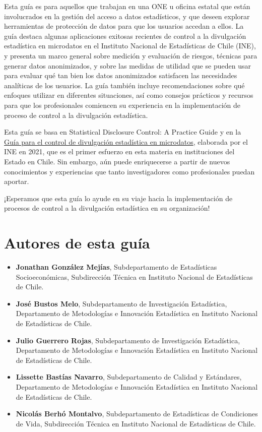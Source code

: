 \documentclass[
]{book}
\theoremstyle{definition}
\theoremstyle{definition}
\theoremstyle{definition}
\theoremstyle{definition}
\theoremstyle{remark}
\begin{document}
Esta guía es para aquellos que trabajan en una ONE u oficina estatal que están involucrados en la gestión del acceso a datos estadísticos, y que deseen explorar herramientas de protección de datos para que los usuarios accedan a ellos. La guía destaca algunas aplicaciones exitosas recientes de control a la divulgación estadística en microdatos en el Instituto Nacional de Estadísticas de Chile (INE), y presenta un marco general sobre medición y evaluación de riesgos, técnicas para generar datos anonimizados, y sobre las medidas de utilidad que se pueden usar para evaluar qué tan bien los datos anonimizados satisfacen las necesidades analíticas de los usuarios. La guía también incluye recomendaciones sobre qué enfoques utilizar en diferentes situaciones, así como consejos prácticos y recursos para que los profesionales comiencen su experiencia en la implementación de proceso de control a la divulgación estadística.

Esta guía se basa en Statistical Disclosure Control: A Practice Guide \citet{benschop2019statistical} y en la \href{https://www.ine.gob.cl/docs/default-source/buenas-practicas/directrices-metodologicas/guias-y-orientaciones-metodologicas/documentos/gu\%C3\%ADa-control-divulgaci\%C3\%B3n-estad\%C3\%ADstica-microdatos.pdf?sfvrsn=b6bdd28f_2}{Guía para el control de divulgación estadística en microdatos}, elaborada por el INE en 2021, que es el primer esfuerzo en esta materia en instituciones del Estado en Chile. Sin embargo, aún puede enriquecerse a partir de nuevos conocimientos y experiencias que tanto investigadores como profesionales puedan aportar.

¡Esperamos que esta guía lo ayude en su viaje hacia la implementación de procesos de control a la divulgación estadística en su organización!

\hypertarget{autores-de-esta-guuxeda}{%
\section{Autores de esta guía}\label{autores-de-esta-guuxeda}}

\begin{itemize}
\item
  \textbf{Jonathan González Mejías}, Subdepartamento de Estadísticas Socioeconómicas, Subdirección Técnica en Instituto Nacional de Estadísticas de Chile.
\item
  \textbf{José Bustos Melo}, Subdepartamento de Investigación Estadística, Departamento de Metodologías e Innovación Estadística en Instituto Nacional de Estadísticas de Chile.
\item
  \textbf{Julio Guerrero Rojas}, Subdepartamento de Investigación Estadística, Departamento de Metodologías e Innovación Estadística en Instituto Nacional de Estadísticas de Chile.
\item
  \textbf{Lissette Bastías Navarro}, Subdepartamento de Calidad y Estándares, Departamento de Metodologías e Innovación Estadística en Instituto Nacional de Estadísticas de Chile.
\item
  \textbf{Nicolás Berhó Montalvo}, Subdepartamento de Estadísticas de Condiciones de Vida, Subdirección Técnica en Instituto Nacional de Estadísticas de Chile.
\end{itemize}
\end{document}
